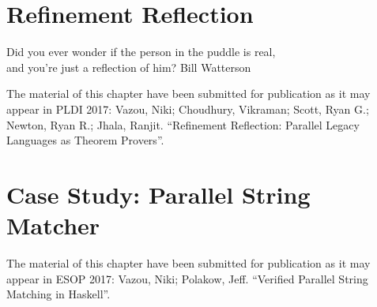 
% 



\chapter{Refinement Reflection}\label{refinementrflection}

\makequote
  {Did you ever wonder if the person in the puddle is real, \\
  and you're just a reflection of him?}
  {Bill Watterson}











The material of this chapter have been submitted for publication as it may appear in PLDI 2017:
\noindent Vazou, Niki; Choudhury, Vikraman; Scott, Ryan G.; Newton, Ryan R.; Jhala, Ranjit.
``Refinement Reflection: Parallel Legacy Languages as Theorem Provers''.



\chapter{Case Study: Parallel String Matcher}\label{stringmatcher}









The material of this chapter have been submitted for publication as it may appear in ESOP 2017:
\noindent Vazou, Niki; Polakow, Jeff.
``Verified Parallel String Matching in Haskell''.